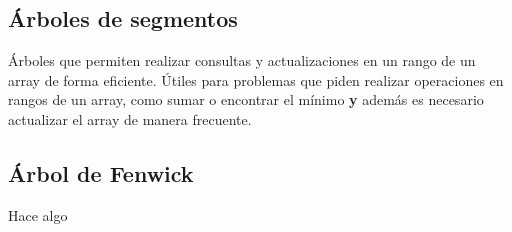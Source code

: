 \subsection{Árboles de segmentos}
Árboles que permiten realizar consultas y actualizaciones en un rango de un
array de forma eficiente. Útiles para problemas que piden realizar operaciones
en rangos de un array, como sumar o encontrar el mínimo \textbf{y} además es
necesario actualizar el array de manera frecuente.


\subsection{Árbol de Fenwick}
Hace algo

